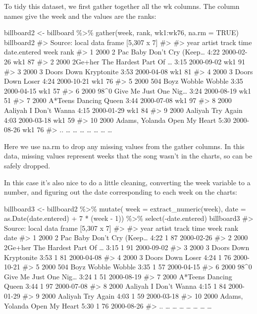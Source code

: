 \documentclass[]{article}
\begin{document}
To tidy this dataset, we first gather together all the wk columns. The
column names give the week and the values are the ranks:

billboard2 \textless{}- billboard \%\textgreater{}\% gather(week, rank,
wk1:wk76, na.rm = TRUE) billboard2 \#\textgreater{} Source: local data
frame {[}5,307 x 7{]} \#\textgreater{} \#\textgreater{} year artist
track time date.entered week rank \#\textgreater{} 1 2000 2 Pac Baby
Don't Cry (Keep\ldots{} 4:22 2000-02-26 wk1 87 \#\textgreater{} 2 2000
2Ge+her The Hardest Part Of \ldots{} 3:15 2000-09-02 wk1 91
\#\textgreater{} 3 2000 3 Doors Down Kryptonite 3:53 2000-04-08 wk1 81
\#\textgreater{} 4 2000 3 Doors Down Loser 4:24 2000-10-21 wk1 76
\#\textgreater{} 5 2000 504 Boyz Wobble Wobble 3:35 2000-04-15 wk1 57
\#\textgreater{} 6 2000 98\^{}0 Give Me Just One Nig\ldots{} 3:24
2000-08-19 wk1 51 \#\textgreater{} 7 2000 A*Teens Dancing Queen 3:44
2000-07-08 wk1 97 \#\textgreater{} 8 2000 Aaliyah I Don't Wanna 4:15
2000-01-29 wk1 84 \#\textgreater{} 9 2000 Aaliyah Try Again 4:03
2000-03-18 wk1 59 \#\textgreater{} 10 2000 Adams, Yolanda Open My Heart
5:30 2000-08-26 wk1 76 \#\textgreater{} .. \ldots{} \ldots{} \ldots{}
\ldots{} \ldots{} \ldots{} \ldots{}

Here we use na.rm to drop any missing values from the gather columns. In
this data, missing values represent weeks that the song wasn't in the
charts, so can be safely dropped.

In this case it's also nice to do a little cleaning, converting the week
variable to a number, and figuring out the date corresponding to each
week on the charts:

billboard3 \textless{}- billboard2 \%\textgreater{}\% mutate( week =
extract\_numeric(week), date = as.Date(date.entered) + 7 * (week - 1))
\%\textgreater{}\% select(-date.entered) billboard3 \#\textgreater{}
Source: local data frame {[}5,307 x 7{]} \#\textgreater{}
\#\textgreater{} year artist track time week rank date \#\textgreater{}
1 2000 2 Pac Baby Don't Cry (Keep\ldots{} 4:22 1 87 2000-02-26
\#\textgreater{} 2 2000 2Ge+her The Hardest Part Of \ldots{} 3:15 1 91
2000-09-02 \#\textgreater{} 3 2000 3 Doors Down Kryptonite 3:53 1 81
2000-04-08 \#\textgreater{} 4 2000 3 Doors Down Loser 4:24 1 76
2000-10-21 \#\textgreater{} 5 2000 504 Boyz Wobble Wobble 3:35 1 57
2000-04-15 \#\textgreater{} 6 2000 98\^{}0 Give Me Just One Nig\ldots{}
3:24 1 51 2000-08-19 \#\textgreater{} 7 2000 A*Teens Dancing Queen 3:44
1 97 2000-07-08 \#\textgreater{} 8 2000 Aaliyah I Don't Wanna 4:15 1 84
2000-01-29 \#\textgreater{} 9 2000 Aaliyah Try Again 4:03 1 59
2000-03-18 \#\textgreater{} 10 2000 Adams, Yolanda Open My Heart 5:30 1
76 2000-08-26 \#\textgreater{} .. \ldots{} \ldots{} \ldots{} \ldots{}
\ldots{} \ldots{} \ldots{}
\end{document}

